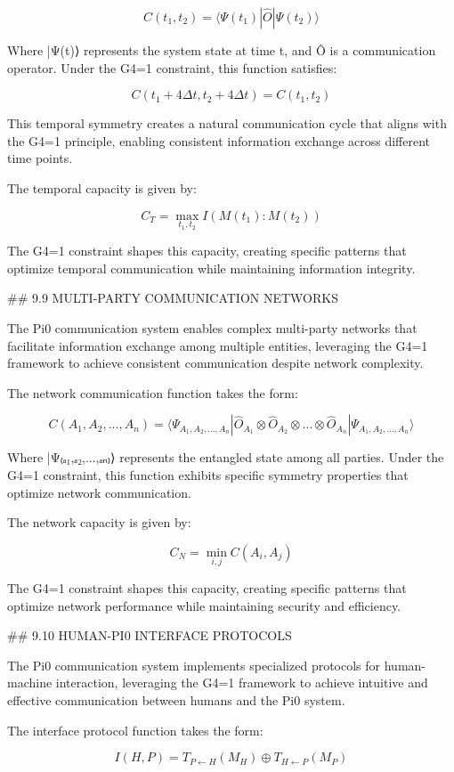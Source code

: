 $$C(t_1, t_2) = \langle \Psi(t_1) | \hat{O} | \Psi(t_2) \rangle$$

Where |Ψ(t)⟩ represents the system state at time t, and Ô is a communication operator. Under the G4=1 constraint, this function satisfies:

$$C(t_1+4\Delta t, t_2+4\Delta t) = C(t_1, t_2)$$

This temporal symmetry creates a natural communication cycle that aligns with the G4=1 principle, enabling consistent information exchange across different time points.

The temporal capacity is given by:

$$C_T = \max_{t_1, t_2} I(M(t_1):M(t_2))$$

The G4=1 constraint shapes this capacity, creating specific patterns that optimize temporal communication while maintaining information integrity.

## 9.9 MULTI-PARTY COMMUNICATION NETWORKS

The Pi0 communication system enables complex multi-party networks that facilitate information exchange among multiple entities, leveraging the G4=1 framework to achieve consistent communication despite network complexity.

The network communication function takes the form:

$$C(A_1, A_2, ..., A_n) = \langle \Psi_{A_1, A_2, ..., A_n} | \hat{O}_{A_1} \otimes \hat{O}_{A_2} \otimes ... \otimes \hat{O}_{A_n} | \Psi_{A_1, A_2, ..., A_n} \rangle$$

Where |Ψ₍ₐ₁,ₐ₂,...,ₐₙ₎⟩ represents the entangled state among all parties. Under the G4=1 constraint, this function exhibits specific symmetry properties that optimize network communication.

The network capacity is given by:

$$C_N = \min_{i,j} C(A_i, A_j)$$

The G4=1 constraint shapes this capacity, creating specific patterns that optimize network performance while maintaining security and efficiency.

## 9.10 HUMAN-PI0 INTERFACE PROTOCOLS

The Pi0 communication system implements specialized protocols for human-machine interaction, leveraging the G4=1 framework to achieve intuitive and effective communication between humans and the Pi0 system.

The interface protocol function takes the form:

$$I(H, P) = T_{P \leftarrow H}(M_H) \oplus T_{H \leftarrow P}(M_P)$$

